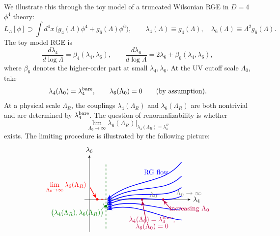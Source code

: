 We illustrate this through the toy model of a truncated Wilsonian RGE in
\(D=4\) \(\phi^4\) theory:
\[
  L_\Lambda[\phi]\supset
  \int d^4x\,\bigl(g_4(\Lambda)\phi^4+g_6(\Lambda)\phi^6\bigr),
  \qquad
  \lambda_4(\Lambda)\equiv g_4(\Lambda),\quad
  \lambda_6(\Lambda)\equiv \Lambda^2 g_6(\Lambda).
\]
The toy model RGE is
\[
  \frac{d\lambda_4}{d\log\Lambda}
  =
  \beta_4(\lambda_4,\lambda_6),
  \qquad
  \frac{d\lambda_6}{d\log\Lambda}
  =
  2\lambda_6+\beta_6(\lambda_4,\lambda_6),
\]
where \(\beta_6\) denotes the higher-order part at small
\(\lambda_4,\lambda_6\).  At the UV cutoff scale \(\Lambda_0\), take
\[
  \lambda_4(\Lambda_0)=\lambda_4^{\rm bare},
  \qquad
  \lambda_6(\Lambda_0)=0
  \qquad\hbox{(by assumption)}.
\]
At a physical scale \(\Lambda_R\), the couplings
\(\lambda_4(\Lambda_R)\) and \(\lambda_6(\Lambda_R)\) are both nontrivial
and are determined by \(\lambda_4^{\rm bare}\).  The question of
renormalizability is whether
\[
  \lim_{\Lambda_0\to\infty}
  \lambda_6(\Lambda_R)
  \bigg|_{\lambda_4(\Lambda_R)=\lambda_4^R}
\]
exists.  The limiting procedure is illustrated by the following picture:
\[
\begin{tikzpicture}[>=Stealth,scale=0.72,baseline=(current bounding box.center)]
  \draw[->] (-.35,0)--(7.2,0) node[right] {\(\lambda_4\)};
  \draw[->] (0,-2.3)--(0,3.15) node[above] {\(\lambda_6\)};

  \draw[green!45!black,dashed,line width=.8pt] (1.18,-2.05)--(1.18,2.55);
  \node[green!45!black,below] at (1.18,-.05) {\(\lambda_4^R\)};
  \fill[green!50!black] (1.18,-.48) circle (2.6pt)
    node[below left] {\(\bigl(\lambda_4(\Lambda_R),\lambda_6(\Lambda_R)\bigr)\)};

  \foreach \y/\bend in {2.65/1.1,1.65/.75,.85/.42,.25/.12,-.65/-.28,-1.45/-.62}
    \draw[blue,line width=1.05pt,->]
      (6.55,\y) .. controls (5.25,\y-0.55-\bend) and (3.3,.45+\bend) ..
      (1.25,-.45+.42*\bend);

  \foreach \x in {3.75,5.25}
    \fill[purple] (\x,0) circle (2.4pt);
  \node[gray] at (4.55,.35) {\(\Lambda_0\)};
  \draw[purple,->,line width=.9pt] (4.05,-1.55)--(3.75,-.1);
  \node[purple,align=center] at (4.45,-1.65)
    {\(\lambda_4(\Lambda_0)=\lambda_4^{\rm bare}\),\\[-.2em]
     \(\lambda_6(\Lambda_0)=0\)};
  \draw[purple,->,line width=.9pt] (5.85,-.75)--(5.25,-.05);
  \node[purple,anchor=west] at (5.52,-.65) {increasing \(\Lambda_0\)};

  \fill[red] (.55,.02) circle (2.4pt);
  \draw[red,dashed,line width=.85pt] (.55,.02)--(1.18,.02);
  \draw[red,->,line width=.9pt] (.05,.86)--(.48,.1);
  \node[red,align=center,anchor=east] at (-.05,.88)
    {\(\displaystyle \lim_{\Lambda_0\to\infty}\lambda_6(\Lambda_R)\)};

  \node[blue] at (4.75,1.95) {RG flow};
  \node[gray,anchor=west] at (6.0,.45) {\(\Lambda_0\to\infty\)};
\end{tikzpicture}
\]

